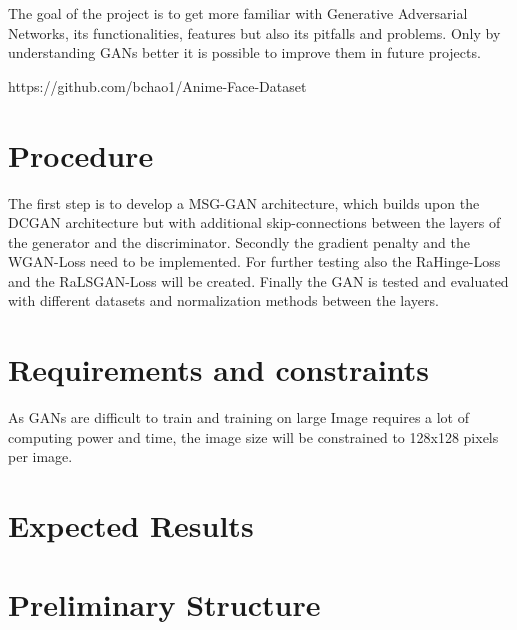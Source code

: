 \documentclass[conference,onecolumn,compsoc]{IEEEtran}
\begin{document}
\noindent
The goal of the project is to get more familiar with Generative Adversarial Networks, its functionalities, features but also its pitfalls and problems. Only by understanding GANs better it is possible to improve them in future projects.

https://github.com/bchao1/Anime-Face-Dataset


\section{Procedure}

\noindent
The first step is to develop a MSG-GAN \cite{karnewar2020msggan} architecture, which builds upon the DCGAN \cite{radford2016unsupervised} architecture but with additional skip-connections between the layers of the generator and the discriminator. Secondly the gradient penalty and the WGAN-Loss need to be implemented. For further testing also the RaHinge-Loss and the RaLSGAN-Loss will be created. Finally the GAN is tested and evaluated with different datasets and normalization methods between the layers.

\section{Requirements and constraints}

\noindent
As GANs are difficult to train and training on large Image requires a lot of computing power and time, the image size will be constrained to 128x128 pixels per image.

\section{Expected Results}

\noindent
\blindtext


\section{Preliminary  Structure}
\end{document}
